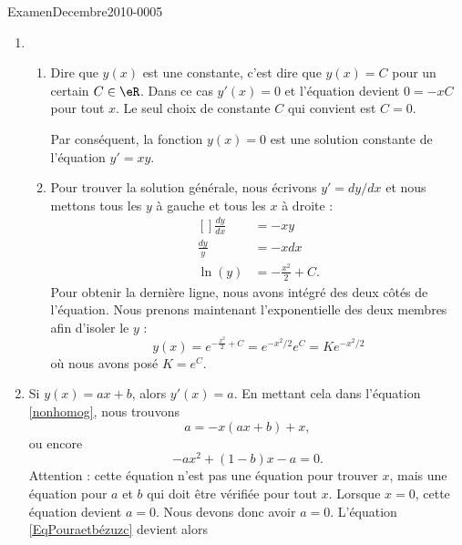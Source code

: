 
\begin{corrige}{ExamenDecembre2010-0005}

	\begin{enumerate}
		\item
			\begin{enumerate}
				\item
					Dire que $y(x)$ est une constante, c'est dire que $y(x)=C$ pour un certain $C\in\eR$. Dans ce cas $y'(x)=0$ et l'équation devient $0=-xC$ pour tout $x$. Le seul choix de constante $C$ qui convient est $C=0$.

					Par conséquent, la fonction $y(x)=0$ est une solution constante de l'équation $y'=xy$.
				\item
					Pour trouver la solution générale, nous écrivons $y'=dy/dx$ et nous mettons tous les $y$ à gauche et tous les $x$ à droite :
					\begin{equation}
						\begin{aligned}[]
							\frac{ dy }{ dx }&=-xy\\
							\frac{ dy }{ y }&=-xdx\\
							\ln(y)&=-\frac{ x^2 }{2}+C.
						\end{aligned}
					\end{equation}
					Pour obtenir la dernière ligne, nous avons intégré des deux côtés de l'équation. Nous prenons maintenant l'exponentielle des deux membres afin d'isoler le $y$ :
					\begin{equation}
						y(x)= e^{-\frac{ x^2 }{2}+C}= e^{-x^2/2} e^{C}=K e^{-x^2/2}
					\end{equation}
					où nous avons posé $K=e^C$.
			\end{enumerate}
		\item
			Si $y(x)=ax+b$, alors $y'(x)=a$. En mettant cela dans l'équation \eqref{nonhomog}, nous trouvons
			\begin{equation}
				a=-x(ax+b)+x,
			\end{equation}
			ou encore
			\begin{equation}	\label{EqPouraetbézuzc}
				-ax^2+(1-b)x-a=0.
			\end{equation}
			Attention : cette équation n'est pas une équation pour trouver $x$, mais une équation pour $a$ et $b$ qui doit être vérifiée pour tout $x$. Lorsque $x=0$, cette équation devient $a=0$. Nous devons donc avoir $a=0$. L'équation \eqref{EqPouraetbézuzc} devient alors

\end{enumerate}
\end{corrige}
